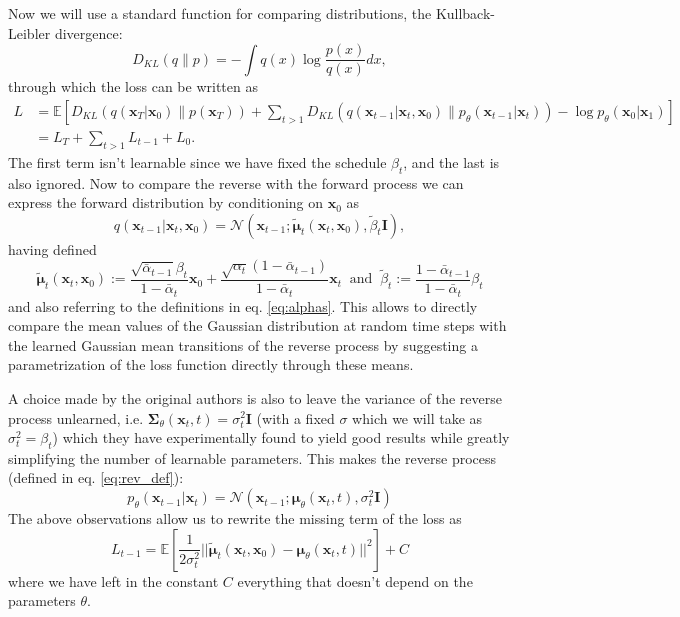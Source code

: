 \documentclass[a4paper, 12pt]{article}          %
\begin{document}
Now we will use a standard function for comparing distributions, the Kullback-Leibler divergence:
\begin{equation}
    D_{KL} (q\|p) = - \int q(x)\log\frac{p(x)}{q(x)}dx,
\end{equation}
through which the loss can be written as 
\begin{equation} \begin{split}
    L &= \mathbb{E} \left[ D_{KL}\left( q(\mathbf{x}_T | \mathbf{x}_0)\| p(\mathbf{x}_T) \right) + \sum_{t>1}D_{KL}\left( q(\mathbf{x}_{t-1} | \mathbf{x}_t, \mathbf{x}_0) \| p_\theta(\mathbf{x}_{t-1} | \mathbf{x}_t) \right) - \log p_\theta(\mathbf{x}_0 | \mathbf{x}_1) \right]\\
    &=  L_T + \sum_{t>1}L_{t-1} + L_0 .
\end{split} \end{equation}
The first term isn't learnable since we have fixed the schedule $\beta_t$, and the last is also ignored. 
Now to compare the reverse with the forward process we can express the forward distribution by conditioning on $\mathbf{x}_0$ as
\begin{equation}
    q(\mathbf{x}_{t-1}|\mathbf{x}_t,\mathbf{x}_0) = \mathcal{N}(\mathbf{x}_{t-1}; \tilde{\boldsymbol{\mu}}_t(\mathbf{x}_t,\mathbf{x}_0),\tilde{\beta}_t\mathbf{I}),
\end{equation}
having defined
\begin{equation} \label{eq:subst}
    \tilde{\boldsymbol{\mu}}_t(\mathbf{x}_t,\mathbf{x}_0) := \frac{\sqrt{\bar{\alpha}_{t-1}}\beta_t}{1-\bar{\alpha}_t}\mathbf{x}_0 + \frac{\sqrt{\alpha_t}(1-\bar{\alpha}_{t-1})}{1-\bar{\alpha}_t}\mathbf{x}_t \;\; \mathrm{and} \;\; \tilde{\beta}_t := \frac{1-\bar{\alpha}_{t-1}}{1-\bar{\alpha}_t}\beta_t
\end{equation}
and also referring to the definitions in eq. \ref{eq:alphas}. This allows to directly compare the mean values of the Gaussian distribution at random time steps with the learned Gaussian mean transitions of the reverse process by suggesting a parametrization of the loss function directly through these means. 

A choice made by the original authors is also to leave the variance of the reverse process unlearned, i.e. $\boldsymbol{\Sigma}_\theta(\mathbf{x}_t,t) = \sigma_t^2\mathbf{I}$  (with a fixed $\sigma$ which we will take as $\sigma^2_t = \beta_t$) which they have experimentally found to yield good results while greatly simplifying the number of learnable parameters. This makes the reverse process (defined in eq. \ref{eq:rev_def}):
\begin{equation}
    p_\theta(\mathbf{x}_{t-1} | \mathbf{x}_t) = \mathcal{N}(\mathbf{x}_{t-1}; \boldsymbol{\mu}_\theta(\mathbf{x}_t, t), \sigma^2_t\mathbf{I})
\end{equation}
The above observations allow us to rewrite the missing term of the loss as
\begin{equation}
    L_{t-1} = \mathbb{E} \left [ \frac{1}{2\sigma^2_t} || \tilde{\boldsymbol{\mu}}_t(\mathbf{x}_t,\mathbf{x}_0) - \boldsymbol{\mu}_\theta (\mathbf{x}_t,t) || ^2 \right] + C
\end{equation}
where we have left in the constant $C$ everything that doesn't depend on the parameters $\theta$. 
\end{document}
